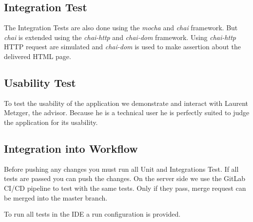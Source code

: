 \subsection{Integration Test}
The Integration Tests are also done using the \textit{mocha} and \textit{chai} framework.
But \textit{chai} is extended using the \textit{chai-http} and \textit{chai-dom} framework.
Using \textit{chai-http} HTTP request are simulated and \textit{chai-dom} is used to make assertion about the delivered HTML page.

\subsection{Usability Test}
To test the usability of the application we demonstrate and interact with Laurent Metzger, the advisor.
Because he is a technical user he is perfectly suited to judge the application for its usability.

\subsection{Integration into Workflow}
Before pushing any changes you must run all Unit and Integrations Test.
If all tests are passed you can push the changes.
On the server side we use the GitLab CI/CD pipeline to test with the same tests.
Only if they pass, merge request can be merged into the master branch.

To run all tests in the IDE a run configuration is provided.
